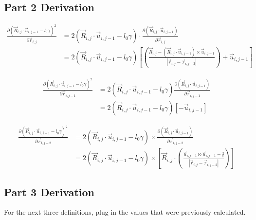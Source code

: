 \documentclass{article}
\renewcommand{\ij}{_{i,j}}
\newcommand{\ijj}{_{i,j-1}}
\newcommand{\ijjj}{_{i,j-2}}
\newcommand{\magn}[1]{\left\vert #1 \right\vert }
\renewcommand{\part}[2]{\frac{\partial #1 }{\partial #2}}
\newcommand{\ten}[1]{\underline{\underline{#1}}}
\newcommand{\rij}{\vec{r} \ij}
\newcommand{\Rij}{\vec{R} \ij}
\newcommand{\rijj}{\vec{r} \ijj}
\newcommand{\rijjj}{\vec{r} \ijjj}
\newcommand{\uijj}{\vec{u} \ijj}
\begin{document}
\subsection{Part 2 Derivation}

\begin{align*}
  \part{\left(\Rij \cdot \uijj - l_0\gamma\right)^2}{\rij }
  &=
2(\Rij \cdot \uijj - l_0\gamma)
\cdot 
\part{\left(\Rij \cdot \uijj\right)}{\rij}
\\
  &=
2(\Rij \cdot \uijj - l_0\gamma)
  \left[
  \left(
  {
  \frac{\Rij - (\Rij \cdot \uijj ) \times \uijj}{\magn{\rij - \rijjj}}
  }
  \right)
  + 
  \vec{u} \ijj 
  \right] 
\end{align*}

\begin{align*}
  \part{\left(\Rij \cdot \uijj - l_0\gamma\right)^2}{\rijj }
  &=
2(\Rij \cdot \uijj - l_0\gamma)
\part{\left(\Rij \cdot \uijj\right)}{\rijj}
\\
& =
2(\Rij \cdot \uijj - l_0\gamma)
\left[
  - \uijj
\right]
\end{align*}

\begin{align*}
  \part{\left(\Rij \cdot \uijj - l_0\gamma\right)^2}{\rijjj }
  &=
2(\Rij \cdot \uijj - l_0\gamma)
\times
\part{\left(\Rij \cdot \uijj\right)}{\rijjj}
\\
& =
2(\Rij \cdot \uijj - l_0\gamma)
\times
\left[
\Rij 
\cdot 
\left(
  \frac{\uijj \otimes \uijj - \ten{\delta}}{\magn{\rij - \rijjj}}
\right)
\right]
\end{align*}

\subsection{Part 3 Derivation}
For the next three definitions, plug in the values that were previously calculated. 
\end{document}
